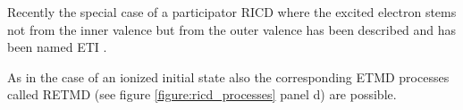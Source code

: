 Recently the special case of a participator \ac{RICD} where the excited
electron stems not from the inner valence but from the outer valence
has been described and has been named \ac{ETI} \cite{Kopelke11}.

As in the case of an ionized initial state also the corresponding ETMD processes
called RETMD (see figure \ref{figure:ricd_processes} panel d) are possible.



